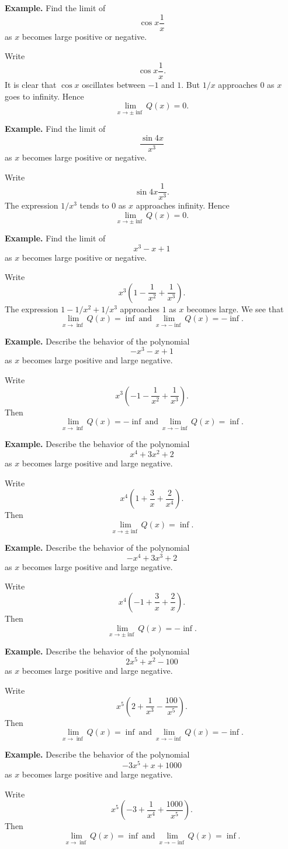 \textbf{Example.} Find the limit of
\[\cos x \frac{1}{x}\]
as $x$ becomes large positive or negative.

Write
\[\cos x \frac{1}{x}.\]
It is clear that $\cos x$ oscillates between $-1$ and $1$. But $1/x$ approaches $0$ as $x$ goes to infinity. Hence
\[\lim_{x\to\pm\inf} Q(x) = 0.\]

\textbf{Example.} Find the limit of
\[\frac{\sin 4x}{x^3}\]
as $x$ becomes large positive or negative.

Write
\[\sin 4x \frac{1}{x^3}.\]
The expression $1/x^3$ tends to $0$ as $x$ approaches infinity. Hence
\[\lim_{x\to\pm\inf} Q(x) = 0.\]

\textbf{Example.} Find the limit of
\[x^3 - x + 1\]
as $x$ becomes large positive or negative.

Write
\[x^3(1 - \frac{1}{x^2} + \frac{1}{x^3}).\]
The expression $1 - 1/x^2 + 1/x^3$ approaches $1$ as $x$ becomes large. We see that
\[\lim_{x\to\inf} Q(x) = \inf\: \text{and}\: \lim_{x\to-\inf} Q(x) = -\inf.\]

\textbf{Example.} Describe the behavior of the polynomial
\[-x^3 - x + 1\]
as $x$ becomes large positive and large negative.

Write
\[x^3(-1 - \frac{1}{x^2} + \frac{1}{x^3}).\]
Then
\[\lim_{x\to\inf} Q(x) = -\inf\: \text{and}\: \lim_{x\to-\inf} Q(x) = \inf.\]

\textbf{Example.} Describe the behavior of the polynomial
\[x^4 + 3x^2 + 2\]
as $x$ becomes large positive and large negative.

Write
\[x^4(1 + \frac{3}{x} + \frac{2}{x^4}).\]
Then
\[\lim_{x\to\pm\inf} Q(x) = \inf.\]

\textbf{Example.} Describe the behavior of the polynomial
\[-x^4 + 3x^3 + 2\]
as $x$ becomes large positive and large negative.

Write
\[x^4(-1 + \frac{3}{x} + \frac{2}{x}).\]
Then
\[\lim_{x\to\pm\inf} Q(x) = -\inf.\]

\textbf{Example.} Describe the behavior of the polynomial
\[2x^5 + x^2 - 100\]
as $x$ becomes large positive and large negative.

Write
\[x^5(2 + \frac{1}{x^3} - \frac{100}{x^5}).\]
Then
\[\lim_{x\to\inf} Q(x) = \inf\: \text{and}\: \lim_{x\to-\inf} Q(x) = -\inf.\]

\textbf{Example.} Describe the behavior of the polynomial
\[-3x^5 + x + 1000\]
as $x$ becomes large positive and large negative.

Write
\[x^5(-3 + \frac{1}{x^4} + \frac{1000}{x^5}).\]
Then
\[\lim_{x\to\inf} Q(x) = \inf\: \text{and}\: \lim_{x\to-\inf} Q(x) = \inf.\]

